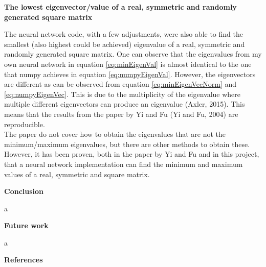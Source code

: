 \documentclass[12pt,a4paper]{article}
\begin{document}
\begin{center}
\large{\textbf{The lowest eigenvector/value of a real, symmetric and randomly generated square matrix}}
\end{center}

\noindent The neural network code, with a few adjustments, were also able to find the smallest (also highest could be achieved) eigenvalue of a real, symmetric and randomly generated square matrix. One can observe that the eigenvalues from my own neural network in equation \ref{eq:minEigenVal} is almost identical to the one that numpy achieves in equation \ref{eq:numpyEigenVal}. However, the eigenvectors are different as can be observed from equation \ref{eq:minEigenVecNorm} and \ref{eq:numpyEigenVec}. This is due to the multiplicity of the eigenvalue where multiple different eigenvectors can produce an eigenvalue (Axler, 2015). This means that the results from the paper by Yi and Fu (Yi and Fu, 2004) are reproducible. 
\\
The paper do not cover how to obtain the eigenvalues that are not the minimum/maximum eigenvalues, but there are other methods to obtain these. However, it has been proven, both in the paper by Yi and Fu and in this project, that a neural network implementation can find the minimum and maximum values of a real, symmetric and square matrix.

\newpage

\begin{center}
\Large{\textbf{Conclusion}}
\end{center}

\noindent a

\newpage

\begin{center}
\Large{\textbf{Future work}}
\end{center}

\noindent a

\newpage

\begin{center}
\Large{\textbf{References}}
\end{center}
\end{document}
